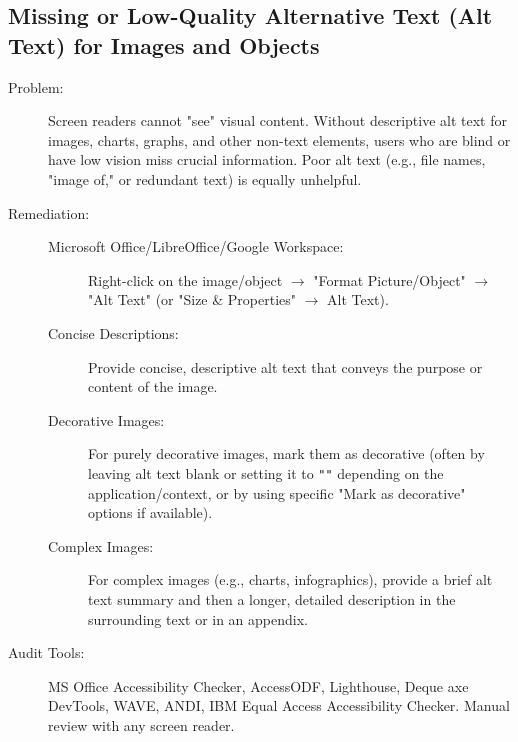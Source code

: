 \subsection{Missing or Low-Quality Alternative Text (Alt Text) for Images and Objects}
\label{subsec:missing-alt-text}
\begin{description}
    \item[Problem:] Screen readers cannot "see" visual content. Without descriptive alt text for images, charts, graphs, and other non-text elements, users who are blind or have low vision miss crucial information. Poor alt text (e.g., file names, "image of," or redundant text) is equally unhelpful.
    \item[Remediation:]
    \begin{description}
        \item[Microsoft Office/LibreOffice/Google Workspace:] Right-click on the image/object $\rightarrow$ "Format Picture/Object" $\rightarrow$ "Alt Text" (or "Size \& Properties" $\rightarrow$ Alt Text).
        \item[Concise Descriptions:] Provide concise, descriptive alt text that conveys the purpose or content of the image.
        \item[Decorative Images:] For purely decorative images, mark them as decorative (often by leaving alt text blank or setting it to \texttt{""} depending on the application/context, or by using specific "Mark as decorative" options if available).
        \item[Complex Images:] For complex images (e.g., charts, infographics), provide a brief alt text summary and then a longer, detailed description in the surrounding text or in an appendix.
    \end{description}
    \item[Audit Tools:] MS Office Accessibility Checker, AccessODF, Lighthouse, Deque axe DevTools, WAVE, ANDI, IBM Equal Access Accessibility Checker. Manual review with any screen reader.
\end{description}

